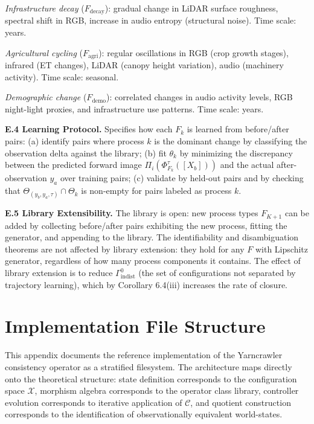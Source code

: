 \documentclass[12pt, oneside]{article}
\begin{document}
{\textit{Infrastructure decay} ($F_{\mathrm{decay}}$): gradual change in LiDAR surface
roughness, spectral shift in RGB, increase in audio entropy (structural noise). Time
scale: years.

\textit{Agricultural cycling} ($F_{\mathrm{agri}}$): regular oscillations in RGB
(crop growth stages), infrared (ET changes), LiDAR (canopy height variation), audio
(machinery activity). Time scale: seasonal.

\textit{Demographic change} ($F_{\mathrm{demo}}$): correlated changes in audio activity
levels, RGB night-light proxies, and infrastructure use patterns. Time scale: years.

\medskip
\textbf{E.4 Learning Protocol.}
Specifies how each $F_k$ is learned from before/after pairs: (a) identify pairs where
process $k$ is the dominant change by classifying the observation delta against the
library; (b) fit $\theta_k$ by minimizing the discrepancy between the predicted
forward image $\Pi_i(\Phi^\tau_{F_k}([X_b]))$ and the actual after-observation $y_a$
over training pairs; (c) validate by held-out pairs and by checking that
$\Theta_{(y_b,y_a,\tau)} \cap \Theta_k$ is non-empty for pairs labeled as process $k$.

\medskip
\textbf{E.5 Library Extensibility.}
The library is open: new process types $F_{K+1}$ can be added by collecting before/after
pairs exhibiting the new process, fitting the generator, and appending to the library.
The identifiability and disambiguation theorems are not affected by library extension:
they hold for any $F$ with Lipschitz generator, regardless of how many process components
it contains. The effect of library extension is to reduce $\Gamma^0_{\mathrm{indist}}$
(the set of configurations not separated by trajectory learning), which by
Corollary 6.4(iii) increases the rate of closure.
}

\section{Implementation File Structure}
\label{app:implementation}

This appendix documents the reference implementation of the Yarncrawler consistency
operator as a stratified filesystem. The architecture maps directly onto the theoretical
structure: state definition corresponds to the configuration space $\mathcal{X}$,
morphism algebra corresponds to the operator class library, controller evolution
corresponds to iterative application of $\mathcal{C}$, and quotient construction
corresponds to the identification of observationally equivalent world-states.
\end{document}
